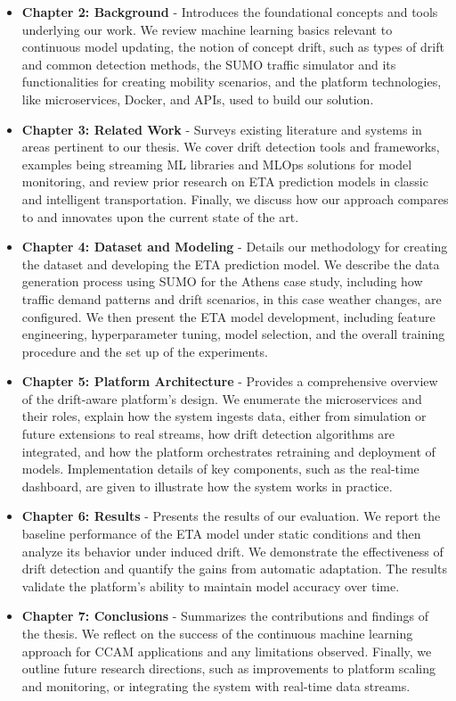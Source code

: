 \begin{itemize}
    \item \textbf{Chapter 2: Background} - Introduces the foundational concepts and tools underlying our work.
        We review machine learning basics relevant to continuous model updating, the notion of concept drift, such as types of drift and common detection methods, the SUMO traffic simulator and its functionalities for creating mobility scenarios, and the platform technologies, like microservices, Docker, and APIs, used to build our solution.

    \item \textbf{Chapter 3: Related Work} - Surveys existing literature and systems in areas pertinent to our thesis.
        We cover drift detection tools and frameworks, examples being streaming ML libraries and MLOps solutions for model monitoring, and review prior research on ETA prediction models in classic and intelligent transportation.
        Finally, we discuss how our approach compares to and innovates upon the current state of the art.

    \item \textbf{Chapter 4: Dataset and Modeling} - Details our methodology for creating the dataset and developing the ETA prediction model.
        We describe the data generation process using SUMO for the Athens case study, including how traffic demand patterns and drift scenarios, in this case weather changes, are configured.
        We then present the ETA model development, including feature engineering, hyperparameter tuning, model selection, and the overall training procedure and the set up of the experiments.

    \item \textbf{Chapter 5: Platform Architecture} - Provides a comprehensive overview of the drift-aware platform's design.
        We enumerate the microservices and their roles, explain how the system ingests data, either from simulation or future extensions to real streams, how drift detection algorithms are integrated, and how the platform orchestrates retraining and deployment of models.
        Implementation details of key components, such as the real-time dashboard, are given to illustrate how the system works in practice.

    \item \textbf{Chapter 6: Results} - Presents the results of our evaluation.
        We report the baseline performance of the ETA model under static conditions and then analyze its behavior under induced drift.
        We demonstrate the effectiveness of drift detection and quantify the gains from automatic adaptation.
        The results validate the platform's ability to maintain model accuracy over time.

    \item \textbf{Chapter 7: Conclusions} - Summarizes the contributions and findings of the thesis.
        We reflect on the success of the continuous machine learning approach for CCAM applications and any limitations observed.
        Finally, we outline future research directions, such as improvements to platform scaling and monitoring, or integrating the system with real-time data streams.

\end{itemize}
